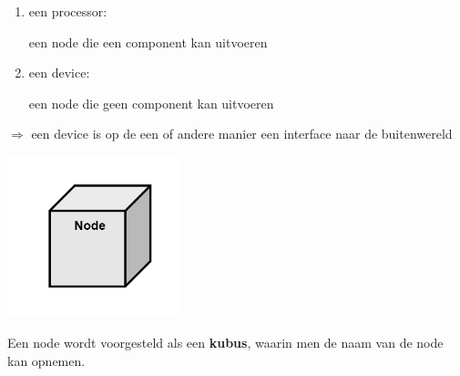 \begin{enumerate}
    \item een processor:
    
    een node die een component kan uitvoeren
    \item een device:
    
    een node die geen component kan uitvoeren
    
\end{enumerate}

$\Rightarrow$ een device is op de een of andere manier een interface naar de buitenwereld


\begin{center}
\includegraphics[width=2in]{img/node}%
\end{center}

Een node wordt voorgesteld als een \textbf{kubus}, waarin men de naam van de node kan opnemen.

